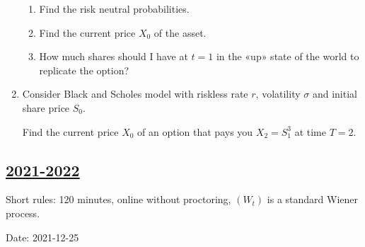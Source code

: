 \begin{enumerate}
\begin{enumerate}
    \item Find the risk neutral probabilities. 
    \item Find the current price $X_0$ of the asset. 
    \item How much shares should I have at $t=1$ in the «up» state of the world to replicate the option?
\end{enumerate}

\item Consider Black and Scholes model with riskless rate $r$, volatility $\sigma$ and initial share price $S_0$. 

Find the current price $X_0$ of an option that pays you $X_2 = S_1^3$ at time $T=2$. 

\end{enumerate}




\subsection[2021-2022]{\hyperref[sec:sol_kr_02_2021_2022]{2021-2022}}
\label{sec:kr_02_2021_2022} %

Short rules: 120 minutes, online without proctoring, $(W_t)$ is a standard Wiener process.

Date: 2021-12-25

